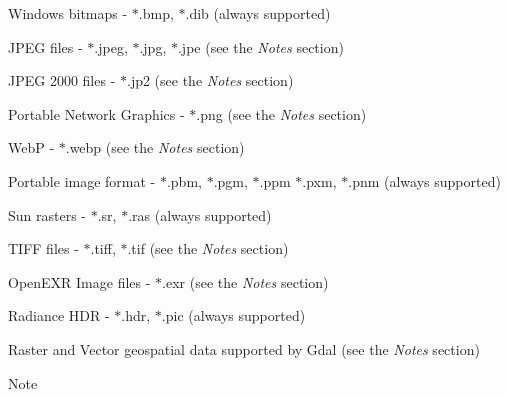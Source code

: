 \begin{DoxyItemize}
\item Windows bitmaps -\/ $\ast$.bmp, $\ast$.dib (always supported)
\item J\+P\+EG files -\/ $\ast$.jpeg, $\ast$.jpg, $\ast$.jpe (see the {\itshape Notes} section)
\item J\+P\+EG 2000 files -\/ $\ast$.jp2 (see the {\itshape Notes} section)
\item Portable Network Graphics -\/ $\ast$.png (see the {\itshape Notes} section)
\item WebP -\/ $\ast$.webp (see the {\itshape Notes} section)
\item Portable image format -\/ $\ast$.pbm, $\ast$.pgm, $\ast$.ppm $\ast$.pxm, $\ast$.pnm (always supported)
\item Sun rasters -\/ $\ast$.sr, $\ast$.ras (always supported)
\item T\+I\+FF files -\/ $\ast$.tiff, $\ast$.tif (see the {\itshape Notes} section)
\item Open\+E\+XR Image files -\/ $\ast$.exr (see the {\itshape Notes} section)
\item Radiance H\+DR -\/ $\ast$.hdr, $\ast$.pic (always supported)
\item Raster and Vector geospatial data supported by Gdal (see the {\itshape Notes} section) 
\end{DoxyItemize}

\begin{DoxyNote}{Note}

\end{DoxyNote}

